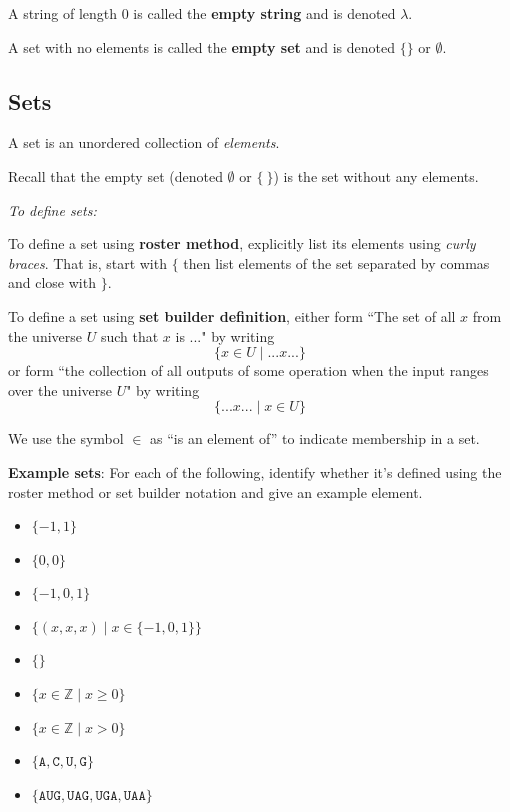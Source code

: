 \documentclass[12pt, oneside]{article}
\newcommand{\A}[0]{\texttt{A}}
\newcommand{\C}[0]{\texttt{C}}
\newcommand{\G}[0]{\texttt{G}}
\newcommand{\U}[0]{\texttt{U}}
\begin{document}
A string of length $0$ is called the {\bf empty string} and is denoted $\lambda$.

A set with no elements is called the {\bf empty set} and is denoted $\{\}$ or $\emptyset$. 

\subsection*{Sets}

A set is an unordered collection of \emph{elements}.

Recall that the empty set (denoted $\emptyset$ or $\{~\}$) is the set without any elements.

{\it To define sets:}

To define a set using {\bf roster method}, explicitly list its elements using \emph{curly braces}. That is,
start with $\{$ then list elements of 
the set separated by commas and close with $\}$.

To define a set using {\bf set builder definition}, either form 
``The set of all $x$ from the universe $U$ such that $x$ is ..." by writing
\[\{x \in U \mid ...x... \}\]
or form ``the collection of all outputs of some operation when the input ranges over the universe $U$"
by writing
\[\{ ...x... \mid x\in U \}\]

We use the symbol $\in$ as ``is an element of'' to indicate membership in a set.\\

\newpage

{\bf Example sets}: For each of the following, identify whether it's defined using the roster method
or set builder notation and give an example element.
\begin{itemize}
    \item[]$\{ -1, 1\}$\\
    \item[]$\{0, 0 \}$\\
    \item[]$\{-1, 0, 1 \}$\\
    \item[]$\{(x,x,x) \mid x \in \{-1,0,1\} \}$\\
    \item[]$\{ \}$\\
    \item[]$\{ x \in \mathbb{Z} \mid x \geq 0 \}$\\
    \item[]$\{ x \in \mathbb{Z}  \mid x > 0 \}$\\
    \item[]$\{\A,\C,\U,\G\}$ \\
    \item[]$\{\A\U\G, \U\A\G, \U\G\A, \U\A\A \}$
\end{itemize}
\end{document}
